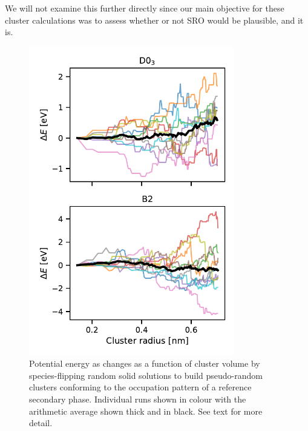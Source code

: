 We will not examine this further directly since our main objective for these cluster calculations was to assess whether or not SRO would be plausible, and it is.
%
\begin{figure}[h]
    \label{fig:0K_clusters}
    \centering
    \includegraphics[width=0.8\textwidth]{figures/zerok_clusters}
    \caption{Potential energy as changes as a function of cluster volume by species-flipping random solid solutions to build pseudo-random clusters conforming to the occupation pattern of a reference secondary phase. Individual runs shown in colour with the arithmetic average shown thick and in black. See text for more detail.}
\end{figure}
%

